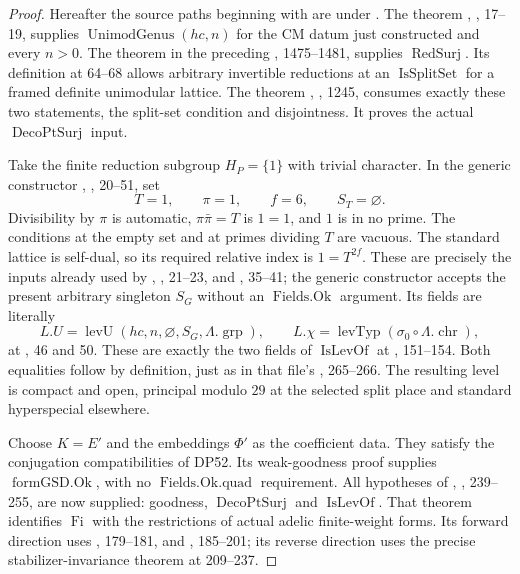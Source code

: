 \documentclass[11pt,a4paper]{article}
\theoremstyle{definition}\newtheorem{remark}[theorem]{Remark}
\begin{document}
\begin{proof}
Hereafter the source paths beginning with  are under
.
The theorem ,
, 17--19, supplies
$\operatorname{UnimodGenus}(hc,n)$ for the CM datum just constructed
and every $n>0$.
The theorem  in the preceding
, 1475--1481, supplies
$\operatorname{RedSurj}$.
Its definition at 64--68 allows arbitrary invertible reductions
at an $\operatorname{IsSplitSet}$ for a framed definite unimodular lattice.
The theorem ,
, 1245, consumes exactly these two statements,
the split-set condition and disjointness.
It proves the actual $\operatorname{DecoPtSurj}$ input.

Take the finite reduction subgroup $H_P=\{1\}$ with trivial
character. In the generic constructor
, , 20--51,
set
\[
 T=1,\qquad \pi=1,\qquad f=6,\qquad S_T=\varnothing.
\]
Divisibility by $\pi$ is automatic, $\pi\bar\pi=T$ is $1=1$,
and $1$ is in no prime. The conditions at the empty set and at
primes dividing $T$ are vacuous.
The standard lattice is self-dual, so its required relative index
is $1=T^{2f}$.
These are precisely the inputs already used by
, , 21--23,
and , 35--41; the generic constructor accepts the
present arbitrary singleton $S_G$ without an
$\operatorname{Fields.Ok}$ argument.
Its fields are literally
\[
 L.U=\operatorname{levU}(hc,n,\varnothing,S_G,\Lambda.\operatorname{grp}),
 \qquad
 L.\chi=\operatorname{levTyp}(\sigma_0\circ\Lambda.\operatorname{chr}),
\]
at , 46 and 50.
These are exactly the two fields of
$\operatorname{IsLevOf}$ at , 151--154.
Both equalities follow by definition, just as in that file's
, 265--266.
The resulting level is compact and open, principal modulo $29$
at the selected split place and standard hyperspecial elsewhere.

Choose $K=E'$ and the embeddings $\Phi'$ as the coefficient data.
They satisfy the conjugation compatibilities of DP52.
Its weak-goodness proof supplies
$\operatorname{formGSD.Ok}$, with no
$\operatorname{Fields.Ok.quad}$ requirement.
All hypotheses of ,
, 239--255, are now supplied:
goodness, $\operatorname{DecoPtSurj}$ and
$\operatorname{IsLevOf}$.
That theorem identifies $\operatorname{Fi}$ with the restrictions
of actual adelic finite-weight forms.
Its forward direction uses , 179--181, and
, 185--201; its reverse direction uses
the precise stabilizer-invariance theorem at 209--237.


\end{proof}
\end{document}
